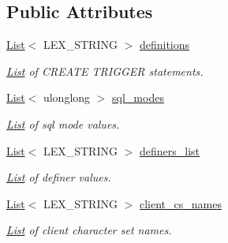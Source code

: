 \subsection*{Public Attributes}
\begin{DoxyCompactItemize}
\item 
\mbox{\label{structTrg__file__data_ab09cd055a96495706a08e251c387857c}} 
\mbox{\hyperlink{classList}{List}}$<$ L\+E\+X\+\_\+\+S\+T\+R\+I\+NG $>$ \mbox{\hyperlink{structTrg__file__data_ab09cd055a96495706a08e251c387857c}{definitions}}
\begin{DoxyCompactList}\small\item\em \mbox{\hyperlink{classList}{List}} of C\+R\+E\+A\+TE T\+R\+I\+G\+G\+ER statements. \end{DoxyCompactList}\item 
\mbox{\label{structTrg__file__data_a1d3e3a4239617ff16853ac65535c0296}} 
\mbox{\hyperlink{classList}{List}}$<$ ulonglong $>$ \mbox{\hyperlink{structTrg__file__data_a1d3e3a4239617ff16853ac65535c0296}{sql\+\_\+modes}}
\begin{DoxyCompactList}\small\item\em \mbox{\hyperlink{classList}{List}} of \textquotesingle{}sql mode\textquotesingle{} values. \end{DoxyCompactList}\item 
\mbox{\label{structTrg__file__data_a6d9289fad894dc761cae9da55df8b481}} 
\mbox{\hyperlink{classList}{List}}$<$ L\+E\+X\+\_\+\+S\+T\+R\+I\+NG $>$ \mbox{\hyperlink{structTrg__file__data_a6d9289fad894dc761cae9da55df8b481}{definers\+\_\+list}}
\begin{DoxyCompactList}\small\item\em \mbox{\hyperlink{classList}{List}} of \textquotesingle{}definer\textquotesingle{} values. \end{DoxyCompactList}\item 
\mbox{\label{structTrg__file__data_a553c32adb97050a1691af415435caebc}} 
\mbox{\hyperlink{classList}{List}}$<$ L\+E\+X\+\_\+\+S\+T\+R\+I\+NG $>$ \mbox{\hyperlink{structTrg__file__data_a553c32adb97050a1691af415435caebc}{client\+\_\+cs\+\_\+names}}
\begin{DoxyCompactList}\small\item\em \mbox{\hyperlink{classList}{List}} of client character set names. \end{DoxyCompactList}\item 

\end{DoxyCompactItemize}
